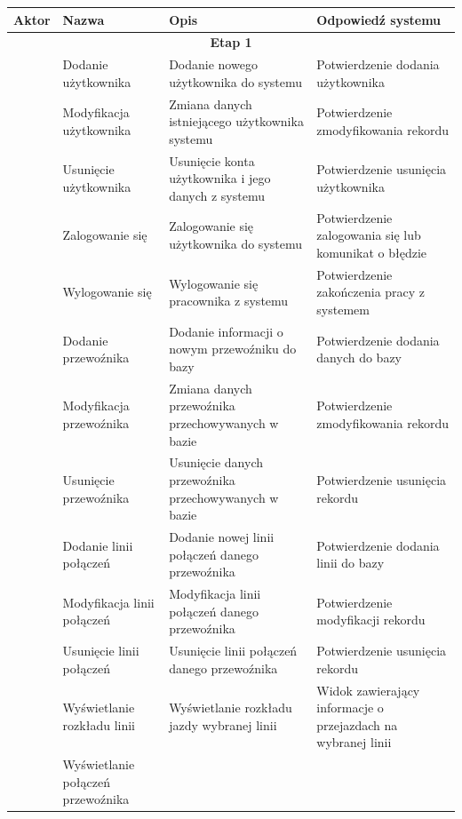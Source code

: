 \documentclass[10pt,a4paper]{article}
\begin{document}
\begin{table}[H]
	\begin{tabularx}{\textwidth}{|c|X|X|X|}
		\hline
		\textbf{Aktor} & \textbf{Nazwa} & \textbf{Opis} & \textbf{Odpowiedź systemu} \\
		\hline
		\multicolumn{4}{|c|}{\textbf{Etap 1}} \\
		\hline
		\multirow{6}{*}{\rotatebox[origin=c]{90}{Administrator}}
		& Dodanie użytkownika
		& Dodanie nowego użytkownika do systemu
		& Potwierdzenie dodania użytkownika \\
		\cline {2-4}
		& Modyfikacja użytkownika
		& Zmiana danych istniejącego użytkownika systemu
		& Potwierdzenie zmodyfikowania rekordu \\
		\cline{2-4}
		& Usunięcie użytkownika
		& Usunięcie konta użytkownika i jego danych z systemu
		& Potwierdzenie usunięcia użytkownika \\
		\hline
		\multirow{26}{*}{\rotatebox[origin=c]{90}{Pracownik}}
		& Zalogowanie się 
		& Zalogowanie się użytkownika do systemu
		& Potwierdzenie zalogowania się lub komunikat o błędzie \\
		\cline{2-4}
		& Wylogowanie się
		& Wylogowanie się pracownika z systemu
		& Potwierdzenie zakończenia pracy z systemem \\
		\cline{2-4}
		& Dodanie przewoźnika
		& Dodanie informacji o nowym przewoźniku do bazy
		& Potwierdzenie dodania danych do bazy \\
		\cline{2-4}
		& Modyfikacja przewoźnika
		& Zmiana danych przewoźnika przechowywanych w bazie
		& Potwierdzenie zmodyfikowania rekordu \\
		\cline{2-4}
		& Usunięcie przewoźnika
		& Usunięcie danych przewoźnika przechowywanych w bazie
		& Potwierdzenie usunięcia rekordu \\
		\cline{2-4}
		& Dodanie linii połączeń
		& Dodanie nowej linii połączeń danego przewoźnika
		& Potwierdzenie dodania linii do bazy \\
		\cline{2-4}
		& Modyfikacja linii połączeń
		& Modyfikacja linii połączeń danego przewoźnika
		& Potwierdzenie modyfikacji rekordu \\
		\cline{2-4}
		& Usunięcie linii połączeń
		& Usunięcie linii połączeń danego przewoźnika
		& Potwierdzenie usunięcia rekordu \\
		\cline{2-4}
		& Wyświetlanie rozkładu linii
		& Wyświetlanie rozkładu jazdy wybranej linii
		& Widok zawierający informacje o przejazdach na wybranej linii \\
		\cline{2-4}
		& Wyświetlanie połączeń przewoźnika

\end{tabularx}
\end{table}
\end{document}
